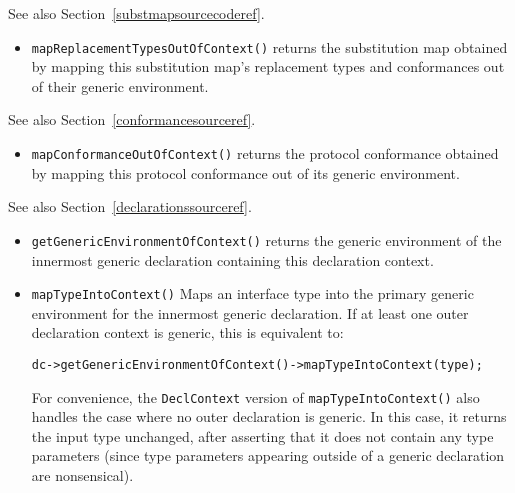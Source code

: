\documentclass[../generics]{subfiles}
\begin{document}
See also Section~\ref{substmapsourcecoderef}.
\begin{itemize}
\item \texttt{mapReplacementTypesOutOfContext()} returns the substitution map obtained by mapping this substitution map's replacement types and conformances out of their generic environment.
\end{itemize}

See also Section~\ref{conformancesourceref}.
\begin{itemize}
\item \texttt{mapConformanceOutOfContext()} returns the protocol conformance obtained by mapping this protocol conformance out of its generic environment.
\end{itemize}

See also Section~\ref{declarationssourceref}.
\begin{itemize}
\item \texttt{getGenericEnvironmentOfContext()} returns the generic environment of the innermost generic declaration containing this declaration context.
\item \texttt{mapTypeIntoContext()} Maps an interface type into the primary generic environment for the innermost generic declaration. If at least one outer declaration context is generic, this is equivalent to:
\begin{Verbatim}
dc->getGenericEnvironmentOfContext()->mapTypeIntoContext(type);
\end{Verbatim}
For convenience, the \texttt{DeclContext} version of \texttt{mapTypeIntoContext()} also handles the case where no outer declaration is generic. In this case, it returns the input type unchanged, after asserting that it does not contain any type parameters (since type parameters appearing outside of a generic declaration are nonsensical).
\end{itemize}
\end{document}
